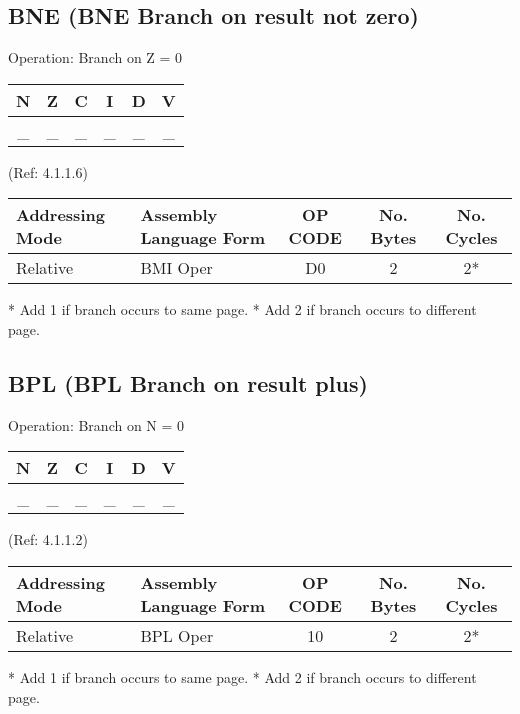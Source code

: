 \documentclass{article}
\begin{document}
  \subsection{BNE (BNE Branch on result not zero)}

  Operation:  Branch on Z = 0
  \begin{table}[H]
  \centering                           
  \begin{tabular}{|c c c c c c|}
  \hline
  N&Z&C&I&D&V\\
  \hline
  \_ & \_ & \_ & \_ & \_ & \_\\
  \hline
  \end{tabular}
  \end{table}
                               (Ref: 4.1.1.6)
  \begin{table}[H]
  \centering
  \begin{tabular}{|l|l|c|c|c|}
  \hline
  Addressing Mode& Assembly Language Form& OP CODE &No. Bytes&No. Cycles\\
  \hline
  Relative      &   BMI Oper            &    D0   &    2    &    2*\\
  \hline
  \end{tabular}
  \end{table}
  * Add 1 if branch occurs to same page.
  * Add 2 if branch occurs to different page.


  \subsection{BPL (BPL Branch on result plus)}

  Operation:  Branch on N = 0
  \begin{table}[H]
  \centering                           
  \begin{tabular}{|c c c c c c|}
  \hline
  N&Z&C&I&D&V\\
  \hline
  \_ & \_ & \_ & \_ & \_ & \_\\
  \hline
  \end{tabular}
  \end{table}
                               (Ref: 4.1.1.2)
  \begin{table}[H]
  \centering
  \begin{tabular}{|l|l|c|c|c|}
  \hline
   Addressing Mode& Assembly Language Form& OP CODE &No. Bytes&No. Cycles\\
  \hline
    Relative      &   BPL Oper            &    10   &    2    &    2*\\
  \hline
  \end{tabular}
  \end{table}
  * Add 1 if branch occurs to same page.
  * Add 2 if branch occurs to different page.
\end{document}

